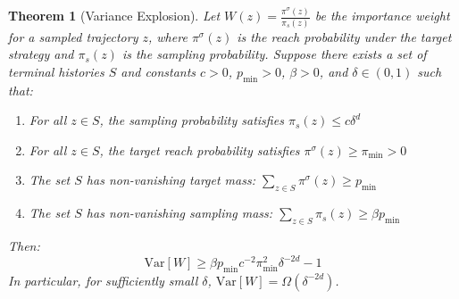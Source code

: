 \documentclass[12pt,a4paper]{article}
\newtheorem{theorem}{Theorem}[section]
\begin{document}
\begin{theorem}[Variance Explosion]
\label{thm:variance_explosion}
Let $W(z) = \frac{\pi^{\sigma}(z)}{\pi_s(z)}$ be the importance weight for a sampled trajectory $z$, where $\pi^{\sigma}(z)$ is the reach probability under the target strategy and $\pi_s(z)$ is the sampling probability. Suppose there exists a set of terminal histories $S$ and constants $c > 0$, $p_{\min} > 0$, $\beta > 0$, and $\delta \in (0,1)$ such that:
\begin{enumerate}
\item For all $z \in S$, the sampling probability satisfies $\pi_s(z) \leq c\delta^{d}$
\item For all $z \in S$, the target reach probability satisfies $\pi^{\sigma}(z) \geq \pi_{\min} > 0$
\item The set $S$ has non-vanishing target mass: $\sum_{z \in S} \pi^{\sigma}(z) \geq p_{\min}$
\item The set $S$ has non-vanishing sampling mass: $\sum_{z \in S} \pi_s(z) \geq \beta p_{\min}$
\end{enumerate}
Then:
$$\text{Var}[W] \geq \beta p_{\min} c^{-2}\pi_{\min}^2 \delta^{-2d} - 1$$
In particular, for sufficiently small $\delta$, $\text{Var}[W] = \Omega(\delta^{-2d})$.
\end{theorem}
\end{document}
